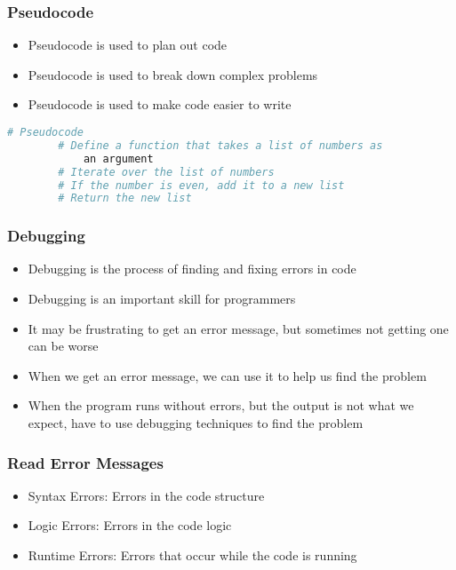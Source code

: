 \documentclass[serif, 9pt, aspectratio=32]{beamer}
\begin{document}
\begin{frame}
    \centering
    \frametitle{Pseudocode}
    \begin{itemize}
        \setlength{\itemsep}{3em}
        \item Pseudocode is used to plan out code
        \item Pseudocode is used to break down complex problems
        \item Pseudocode is used to make code easier to write
    \end{itemize}
\end{frame}

\begin{frame}[fragile]
    \begin{lstlisting}[language=Python]
        # Pseudocode
        # Define a function that takes a list of numbers as 
            an argument
        # Iterate over the list of numbers
        # If the number is even, add it to a new list
        # Return the new list
    \end{lstlisting}
\end{frame}

\begin{frame}
    \centering
    \frametitle{Debugging}
    \begin{itemize}
        \setlength{\itemsep}{3em}
        \item Debugging is the process of finding and fixing errors in code
        \item Debugging is an important skill for programmers
        \item It may be frustrating to get an error message, but sometimes not getting one can be worse
        \item When we get an error message, we can use it to help us find the problem
        \item When the program runs without errors, but the output is not what we expect, have to use debugging techniques to find the problem
    \end{itemize}
\end{frame}

\begin{frame}
    \centering
    \frametitle{Read Error Messages}
    \begin{itemize}
        \setlength{\itemsep}{3em}
        \item Syntax Errors: Errors in the code structure
        \item Logic Errors: Errors in the code logic
        \item Runtime Errors: Errors that occur while the code is running
    \end{itemize}
\end{frame}
\end{document}
